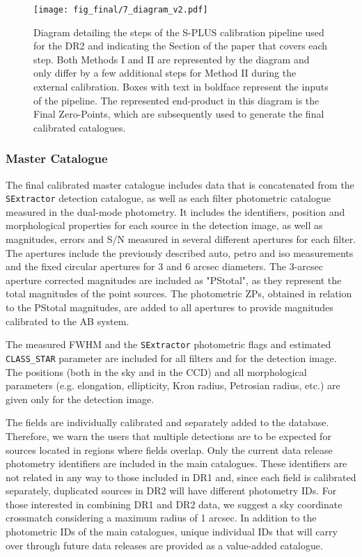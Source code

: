 \documentclass[fleqn,usenatbib]{mnras}
\begin{document}
\begin{figure*}
\begin{center}
\texttt{[image: fig\_final/7\_diagram\_v2.pdf]}
\caption{\label{fig:diagram}Diagram detailing the steps of the S-PLUS calibration pipeline used for the DR2 and indicating the Section of the paper that covers each step. Both Methods I and II are represented by the diagram and only differ by a few additional steps for Method II during the external calibration. Boxes with text in boldface represent the inputs of the pipeline. The represented end-product in this diagram is the Final Zero-Points, which are subsequently used to generate the final calibrated catalogues.}
\end{center}
\end{figure*}


\subsubsection{Master Catalogue}

The final calibrated master catalogue includes data that is concatenated from the \texttt{SExtractor} detection catalogue, as well as each filter photometric catalogue measured in the dual-mode photometry. It includes the identifiers, position and morphological properties for each source in the detection image, as well as magnitudes, errors and S/N measured in several different apertures for each filter. The apertures include the previously described auto, petro and iso measurements and the fixed circular apertures for 3 and 6 arcsec diameters. The 3-arcsec aperture corrected magnitudes are included as "PStotal", as they represent the total magnitudes of the point sources. The photometric ZPs, obtained in relation to the PStotal magnitudes, are added to all apertures to provide magnitudes calibrated to the AB system.

The measured FWHM and the \texttt{SExtractor} photometric flags and estimated \texttt{CLASS\_STAR} parameter are included for all filters and for the detection image. The positions (both in the sky and in the CCD) and all morphological parameters (e.g. elongation, ellipticity,  Kron radius, Petrosian radius, etc.) are given only for the detection image.

The fields are individually calibrated and separately added to the database. Therefore, we warn the users that multiple detections are to be expected for sources located in regions where fields overlap. Only the current data release photometry identifiers are included in the main catalogues. These identifiers are not related in any way to those included in DR1 and, since each field is calibrated separately, duplicated sources in DR2 will have different photometry IDs. For those interested in combining DR1 and DR2 data, we suggest a sky coordinate crossmatch considering a maximum radius of 1 arcsec. In addition to the photometric IDs of the main catalogues, unique individual IDs that will carry over through future data releases are provided as a value-added catalogue.
\end{document}
